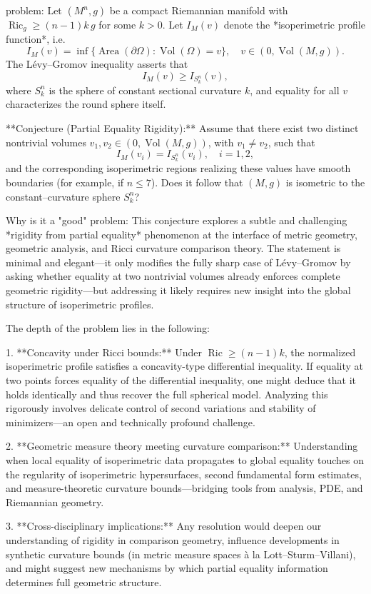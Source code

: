 problem:  
Let \((M^n,g)\) be a compact Riemannian manifold with \(\operatorname{Ric}_g \ge (n-1)k\, g\) for some \(k>0\).  
Let \(I_M(v)\) denote the *isoperimetric profile function*, i.e.  
\[
I_M(v)=\inf\{\operatorname{Area}(\partial\Omega):\operatorname{Vol}(\Omega)=v\}, \quad v\in(0,\operatorname{Vol}(M,g)).
\]  
The Lévy–Gromov inequality asserts that  
\[
I_M(v) \ge I_{S_k^n}(v),
\]  
where \(S_k^n\) is the sphere of constant sectional curvature \(k\), and equality for all \(v\) characterizes the round sphere itself.

**Conjecture (Partial Equality Rigidity):**  
Assume that there exist two distinct nontrivial volumes \(v_1,v_2\in(0,\operatorname{Vol}(M,g))\), with \(v_1\neq v_2\), such that  
\[
I_M(v_i)= I_{S_k^n}(v_i),\quad i=1,2,
\]  
and the corresponding isoperimetric regions realizing these values have smooth boundaries (for example, if \(n\le 7\)).  
Does it follow that \((M,g)\) is isometric to the constant–curvature sphere \(S_k^n\)?

Why is it a "good" problem:  
This conjecture explores a subtle and challenging *rigidity from partial equality* phenomenon at the interface of metric geometry, geometric analysis, and Ricci curvature comparison theory. The statement is minimal and elegant—it only modifies the fully sharp case of Lévy–Gromov by asking whether equality at two nontrivial volumes already enforces complete geometric rigidity—but addressing it likely requires new insight into the global structure of isoperimetric profiles.

The depth of the problem lies in the following:

1. **Concavity under Ricci bounds:** Under \(\operatorname{Ric}\ge (n-1)k\), the normalized isoperimetric profile satisfies a concavity-type differential inequality. If equality at two points forces equality of the differential inequality, one might deduce that it holds identically and thus recover the full spherical model. Analyzing this rigorously involves delicate control of second variations and stability of minimizers—an open and technically profound challenge.

2. **Geometric measure theory meeting curvature comparison:** Understanding when local equality of isoperimetric data propagates to global equality touches on the regularity of isoperimetric hypersurfaces, second fundamental form estimates, and measure-theoretic curvature bounds—bridging tools from analysis, PDE, and Riemannian geometry.

3. **Cross-disciplinary implications:** Any resolution would deepen our understanding of rigidity in comparison geometry, influence developments in synthetic curvature bounds (in metric measure spaces à la Lott–Sturm–Villani), and might suggest new mechanisms by which partial equality information determines full geometric structure.

